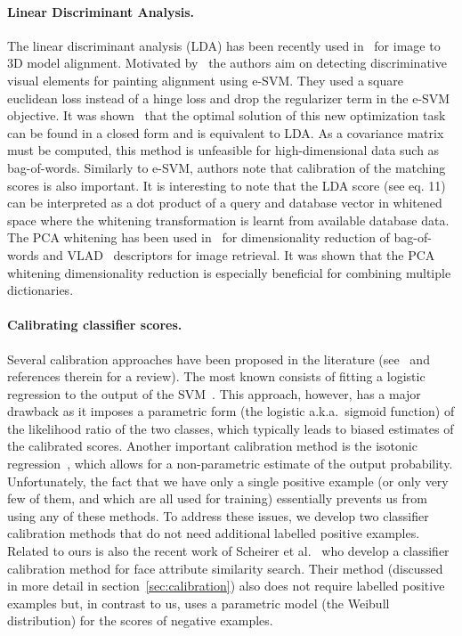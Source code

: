 \paragraph{Linear Discriminant Analysis.}
  \textcolor{petr}{
    The linear discriminant analysis (LDA) has been recently used in~\cite{Aubry13} for image to 3D model alignment. Motivated by~\cite{Shrivastava11} the authors aim on detecting discriminative visual elements for painting alignment using e-SVM. They used a square euclidean loss instead of a hinge loss and drop the regularizer term in the e-SVM objective. It was shown~\cite{Hariharan12} that the optimal solution of this new optimization task can be found in a closed form and is equivalent to LDA. As a covariance matrix must be computed, this method is unfeasible for high-dimensional data such as bag-of-words. Similarly to e-SVM, authors note that calibration of the matching scores is also important. It is interesting to note that the LDA score (see \cite{Aubry13} eq. 11) can be interpreted as a dot product of a query and database vector in whitened space where the whitening transformation is learnt from available database data. The PCA whitening has been used in~\cite{JegouChum12} 
    for dimensionality reduction of bag-of-words and VLAD~\cite{Jegou2012HAL} descriptors for image retrieval. It was shown that the PCA whitening dimensionality reduction is especially beneficial for combining multiple dictionaries.
  }

\paragraph{Calibrating classifier scores.} 
  Several calibration approaches have been proposed in the literature (see~\cite{gebel2007calibrating} and references therein for a review). The most known consists of fitting a logistic regression to the output of the SVM~\cite{Platt99}.  This approach, however, has a major drawback as it imposes a parametric form (the logistic a.k.a.\ sigmoid function) of the likelihood ratio of the two classes, which typically leads to biased estimates of the calibrated scores. Another important calibration method is the isotonic regression~\cite{zadrozny2002transforming}, which allows for a non-parametric estimate of the output probability.
  Unfortunately, the fact that we have only a single positive example (or only very few of them, and which are all used for training) essentially prevents us from using any of these methods. 
  To address these issues, we develop two classifier calibration methods that do not need additional labelled positive examples. Related to ours is also the recent work of Scheirer et al.~\cite{Scheirer12} who develop a classifier calibration method for face attribute similarity search. Their method (discussed in more detail in section~\ref{sec:calibration}) also does not require labelled positive examples but, in contrast to us, uses a parametric model (the Weibull distribution) for the scores of negative examples.    


